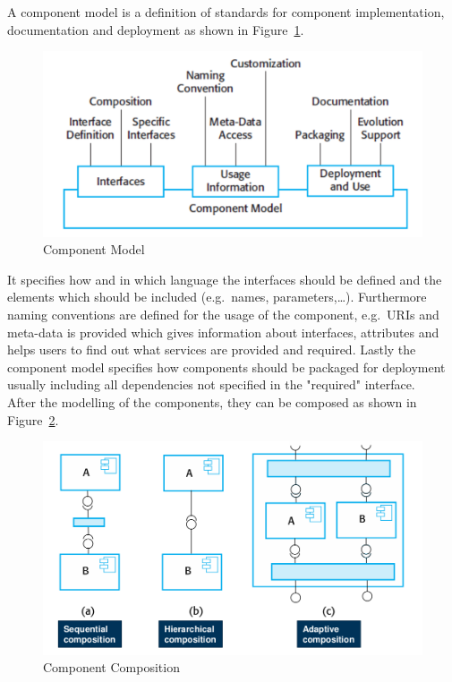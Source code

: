 A component model is a definition of standards for component implementation, documentation and deployment as shown in Figure~\ref{fig:component_model}.
\begin{figure}[h]
  \centering
  \includegraphics[width=.8\textwidth]{images/component_model.png}
  \caption{Component Model}\label{fig:component_model}
\end{figure}
It specifies how and in which language the interfaces should be defined and the elements which should be included (e.g.\ names, parameters,\ldots).
Furthermore naming conventions are defined for the usage of the component, e.g.\ URIs and meta-data is provided which gives information about interfaces, attributes and helps users to find out what services are provided and required.
Lastly the component model specifies how components should be packaged for deployment usually including all dependencies not specified in the "required" interface.\\

After the modelling of the components, they can be composed as shown in Figure~\ref{fig:component_composition}.
\newline

\begin{figure}[h]
  \centering
  \includegraphics[width=.7\textwidth]{images/component_composition.png}
  \caption{Component Composition}\label{fig:component_composition}
\end{figure}

